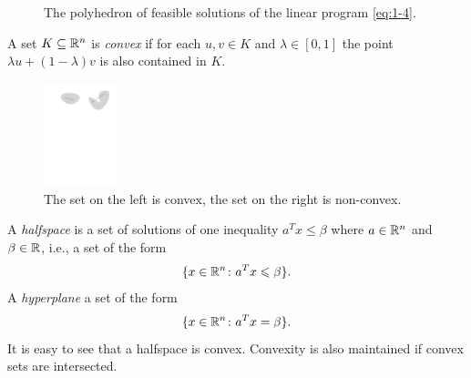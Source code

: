 \begin{example}
\begin{figure}
      \caption{The polyhedron of feasible solutions of the linear program \eqref{eq:1-4}.}
      \label{fig:1}
    \end{figure}

\end{example}








\begin{definition}
  \label{conv:def:2}
  A set $K\subseteq\mathbb{R}^n$ is \emph{convex} if for each $u,v \in K$
  and $\lambda \in [0,1]$ the point $\lambda u+(1-\lambda)v$ is also
  contained in $K$. \end{definition}
\begin{figure}[htbp]
  \centering
  \includegraphics[height=3cm]{figures/exconv.pdf} 
  \caption{The set on the left is convex, the set on the right is  non-convex.}\label{conv:fig:3}
  
\end{figure}


A \emph{halfspace} is a set of solutions of one inequality $a^Tx \leq
\beta$ where $a \in \mathbb{R}^n$ and $\beta \in \mathbb{R}$, i.e., a set of the form
\begin{displaymath}
  \{ x \in \mathbb{R}^n \colon a^Tx \leqslant \beta\}. 
\end{displaymath} 
A \emph{hyperplane} a set of the form 
\begin{displaymath}
  \{ x \in \mathbb{R}^n \colon a^Tx = \beta\}. 
\end{displaymath} 
It is easy to see that a halfspace is convex. Convexity is also maintained if convex sets are intersected. 

